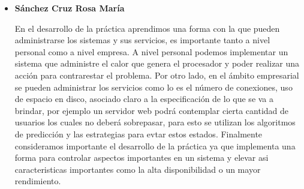 
\begin{itemize}
\item \textbf{Sánchez Cruz Rosa María}

En el desarrollo de la práctica aprendimos una forma con la que pueden administrarse los sistemas y sus servicios, es importante tanto a nivel personal como a nivel empresa.
A nivel personal podemos implementar un sistema que administre el calor que genera el procesador y poder realizar una acción para contrarestar el problema. Por otro lado, en el ámbito empresarial se pueden administrar los servicios como lo es el número de conexiones, uso de espacio en disco, asociado claro a la especificación de lo que se va a brindar, por ejemplo un servidor web podrá contemplar cierta cantidad de usuarios los cuales no deberá sobrepasar, para esto se utilizan los algoritmos de predicción y las estrategias para evtar estos estados. 
Finalmente consideramos importante el desarrollo de la práctica ya que implementa una forma para controlar aspectos importantes en un sistema y elevar asi caracteristicas importantes como la alta disponibilidad o un mayor rendimiento.

\end{itemize}

